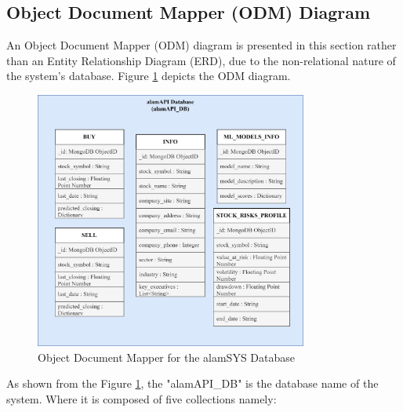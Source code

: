 \subsection{Object Document Mapper (ODM) Diagram}
\label{subsec:odm_subsec}
An Object Document Mapper (ODM) diagram is presented in this section rather than an Entity Relationship 
Diagram (ERD), due to the non-relational nature of the system's database. Figure \ref{fig:odm} depicts 
the ODM diagram.
\begin{figure}[ht]
    \centering
    \includegraphics[width=0.80\textwidth]{./assets/Chapter_3/ODM/ODM.png}
    \caption{Object Document Mapper for the alamSYS Database}
    \label{fig:odm}
\end{figure}
\FloatBarrier
As shown from the Figure \ref{fig:odm}, the "alamAPI\_DB" is the database
name of the system. Where it is composed of five collections namely:

